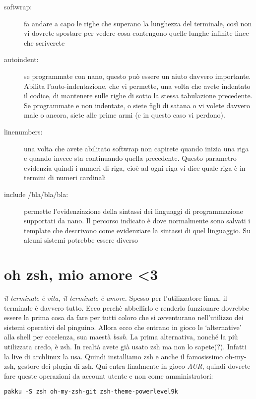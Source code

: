 \documentclass[twoside,italian]{book}
\newcommand{\centcode}[1]{
	
	\definecolor{centcode}{rgb}{0.5,0.1,0.1}
	
	\begin{center}
	 	\texttt{\textcolor{centcode}{#1}}
	\end{center}
	
	
}
\begin{document}
			\begin{description}
				
				\item[softwrap:] fa andare a capo le righe che superano la lunghezza del terminale, così non vi dovrete spostare per vedere cosa contengono quelle lunghe infinite linee che scriverete
				
				\item[autoindent:] se programmate con nano, questo può essere un aiuto davvero importante. Abilita l'auto-indentazione, che vi permette, una volta che avete indentato il codice, di mantenere sulle righe di sotto la stessa tabulazione precedente. Se programmate e non indentate, o siete figli di satana o vi volete davvero male o ancora, siete alle prime armi (e in questo caso vi perdono).
				
				\item [linenumbers:] una volta che avete abilitato softwrap non capirete quando inizia una riga e quando invece sta continuando quella precedente. Questo parametro evidenzia quindi i numeri di riga, cioè ad ogni riga vi dice quale riga è in termini di numeri cardinali
				
				\item[include /bla/bla/bla:] permette l'evidenziazione della sintassi dei linguaggi di programmazione supportati da nano. Il percorso indicato è dove normalmente sono salvati i template che descrivono come evidenziare la sintassi di quel linguaggio. Su alcuni sistemi potrebbe essere diverso
			\end{description}
		
		\section{oh zsh, mio amore <3}
			
			\textit{il terminale è vita, il terminale è amore.} Spesso per l'utilizzatore linux, il terminale è davvero tutto. Ecco perchè abbellirlo e renderlo funzionare dovrebbe essere la prima cosa da fare per tutti coloro che si avventurano nell'utilizzo dei sistemi operativi del pinguino. Allora ecco che entrano in gioco le `alternative' alla shell per eccelenza, sua maestà \textit{bash}.
			La prima alternativa, nonché la più utilizzata credo, è zsh. In realtà avete già usato zsh ma non lo sapete(?). Infatti la live di archlinux la usa.
			Quindi installiamo zsh e anche il famosissimo oh-my-zsh, gestore dei plugin di zsh.
			Qui entra finalmente in gioco \textit{AUR}, quindi dovrete fare queste operazioni da account utente e non come amministratori:
			\centcode{pakku -S zsh oh-my-zsh-git zsh-theme-powerlevel9k}
			
\end{document}
